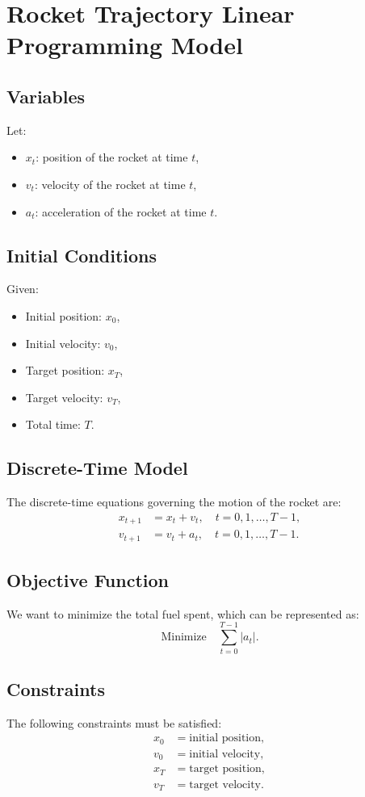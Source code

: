 \documentclass{article}
\begin{document}
\section*{Rocket Trajectory Linear Programming Model}

\subsection*{Variables}
Let:
\begin{itemize}
    \item $x_t$: position of the rocket at time $t$,
    \item $v_t$: velocity of the rocket at time $t$,
    \item $a_t$: acceleration of the rocket at time $t$.
\end{itemize}

\subsection*{Initial Conditions}
Given:
\begin{itemize}
    \item Initial position: $x_0$,
    \item Initial velocity: $v_0$,
    \item Target position: $x_T$,
    \item Target velocity: $v_T$,
    \item Total time: $T$.
\end{itemize}

\subsection*{Discrete-Time Model}
The discrete-time equations governing the motion of the rocket are:
\begin{align}
    x_{t+1} &= x_t + v_t, \quad t = 0, 1, \ldots, T-1, \\
    v_{t+1} &= v_t + a_t, \quad t = 0, 1, \ldots, T-1.
\end{align}

\subsection*{Objective Function}
We want to minimize the total fuel spent, which can be represented as:
\[
\text{Minimize} \quad \sum_{t=0}^{T-1} |a_t|.
\]

\subsection*{Constraints}
The following constraints must be satisfied:
\begin{align}
    x_0 & = \text{initial position}, \\
    v_0 & = \text{initial velocity}, \\
    x_T & = \text{target position}, \\
    v_T & = \text{target velocity}.
\end{align}
\end{document}
